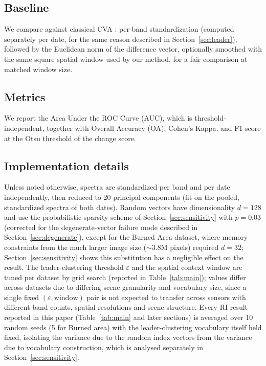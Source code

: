 \documentclass[11pt]{article}
\begin{document}
\subsection{Baseline}

We compare against classical CVA \citep{malila1980}: per-band standardization (computed separately per date, for the same reason described in Section~\ref{sec:leader}), followed by the Euclidean norm of the difference vector, optionally smoothed with the same square spatial window used by our method, for a fair comparison at matched window size.

\subsection{Metrics}

We report the Area Under the ROC Curve (AUC), which is threshold-independent, together with Overall Accuracy (OA), Cohen's Kappa, and F1 score at the Otsu threshold of the change score.

\subsection{Implementation details}

Unless noted otherwise, spectra are standardized per band and per date independently, then reduced to 20 principal components (fit on the pooled, standardized spectra of both dates). Random vectors have dimensionality $d = 128$ and use the probabilistic-sparsity scheme of Section~\ref{sec:sensitivity} with $p=0.03$ (corrected for the degenerate-vector failure mode described in Section~\ref{sec:degenerate}), except for the Burned Area dataset, where memory constraints from the much larger image size ($\sim\!3.8$M pixels) required $d = 32$; Section~\ref{sec:sensitivity} shows this substitution has a negligible effect on the result. The leader-clustering threshold $\varepsilon$ and the spatial context window are tuned per dataset by grid search (reported in Table~\ref{tab:main}); values differ across datasets due to differing scene granularity and vocabulary size, since a single fixed $(\varepsilon, \text{window})$ pair is not expected to transfer across sensors with different band counts, spatial resolutions and scene structure. Every RI result reported in this paper (Table~\ref{tab:main} and later sections) is averaged over 10 random seeds (5 for Burned area) with the leader-clustering vocabulary itself held fixed, isolating the variance due to the random index vectors from the variance due to vocabulary construction, which is analysed separately in Section~\ref{sec:sensitivity}.
\end{document}

